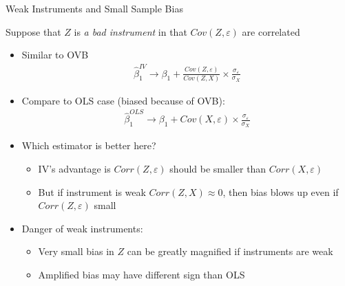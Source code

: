 \documentclass[aspectratio=169,11pt]{beamer}
\begin{document}
\begin{frame}{Weak Instruments and Small Sample Bias}

Suppose that $Z$ is \emph{a bad instrument} in that $Cov(Z,\varepsilon)$ are correlated

\begin{itemize}
	\item Similar to OVB
		\begin{align*}
			\hat\beta_1^{IV}  \to \beta_1 + \frac{Cov(Z,\varepsilon)}{Cov(Z,X)}\times\frac{\sigma_\varepsilon}{\sigma_X}
		\end{align*}
	\item Compare to OLS case (biased because of OVB):
		\begin{align*}
			\hat\beta_1^{OLS} \to \beta_1 + Cov(X,\varepsilon)\times\frac{\sigma_\varepsilon}{\sigma_X}
		\end{align*}

	\item Which estimator is better here?
		\begin{itemize}
			\item IV's advantage is $Corr(Z,\varepsilon)$ should be smaller than $Corr(X,\varepsilon)$
			\item But if instrument is weak $Corr(Z,X)\approx 0$, then bias blows up even if $Corr(Z,\varepsilon)$ small
		\end{itemize}
\medskip
	\item Danger of weak instruments:
		\begin{itemize}
			\item Very small bias in $Z$ can be greatly magnified if instruments are weak
			\item Amplified bias may have different sign than OLS
		\end{itemize}
\end{itemize}
\end{frame}
\end{document}
